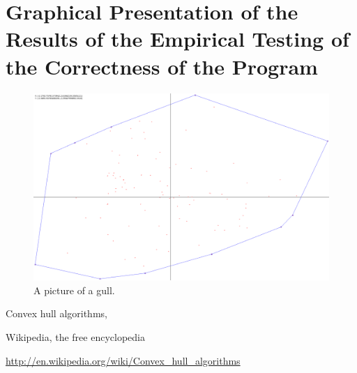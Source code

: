\documentclass[a4paper,12pt,leqno,titlepage]{article}
\begin{document}
\pagebreak
\section{Graphical Presentation of the Results of the Empirical Testing of the Correctness of the Program}
\begin{figure}[h!]
\caption{A picture of a gull.} %
\centering
\includegraphics[width=\textwidth]{gull.png}
\end{figure}

\pagebreak


\begin{thebibliography}{9}

Convex hull algorithms,

Wikipedia, the free encyclopedia

\url{http://en.wikipedia.org/wiki/Convex_hull_algorithms}


\end{thebibliography}
\end{document}

